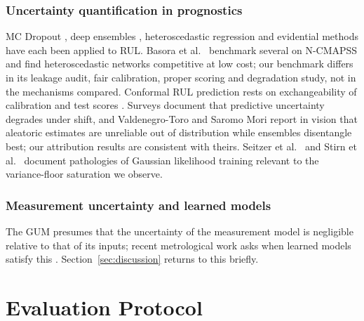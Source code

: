 \documentclass[journal]{IEEEtran}
\begin{document}
\subsubsection*{Uncertainty quantification in prognostics}
MC Dropout \cite{gal2016}, deep ensembles \cite{lakshminarayanan2017}, heteroscedastic regression \cite{nix1994,kendall2017} and evidential methods \cite{ayed2025} have each been applied to RUL. Basora et al.\ \cite{basora2025} benchmark several on N-CMAPSS and find heteroscedastic networks competitive at low cost; our benchmark differs in its leakage audit, fair calibration, proper scoring and degradation study, not in the mechanisms compared. Conformal RUL prediction \cite{zhan2024,piao2025,mao2024} rests on exchangeability of calibration and test scores \cite{barber2023}. Surveys \cite{gawlikowski2023,ovadia2019} document that predictive uncertainty degrades under shift, and Valdenegro-Toro and Saromo Mori \cite{valdenegro2022} report in vision that aleatoric estimates are unreliable out of distribution while ensembles disentangle best; our attribution results are consistent with theirs. Seitzer et al.\ \cite{seitzer2022} and Stirn et al.\ \cite{stirn2022} document pathologies of Gaussian likelihood training relevant to the variance-floor saturation we observe.
\subsubsection*{Measurement uncertainty and learned models}
The GUM \cite{gum2008} presumes that the uncertainty of the measurement model is negligible relative to that of its inputs; recent metrological work asks when learned models satisfy this \cite{angrisani2026}. Section~\ref{sec:discussion} returns to this briefly.

\section{Evaluation Protocol}
\label{sec:protocol}
\end{document}
